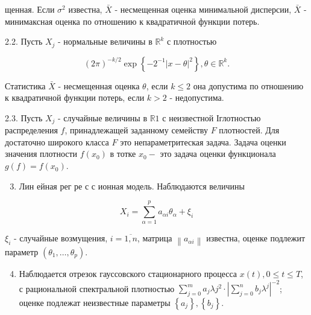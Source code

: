 \documentclass[10pt]{article}
\begin{document}
щенная. Если $\sigma^{2}$ известна, $\bar{X}$ - несмещенная оценка минимальной дисперсии, $\bar{X}$ - минимаксная оценка по отношению к квадратичноӥ функции потерь.



2.2. Пусть $X_{j}$ - нормальные величины в $\mathbb{R}^{k}$ с плотностью



\[

(2 \pi)^{-k / 2} \exp \left\{-2^{-1}|x-\theta|^{2}\right\}, \theta \in \mathbb{R}^{k} .

\]



Статистика $\bar{X}$ - несмещенная оценка $\theta$, если $k \leqslant 2$ она допустима по отношению к квадратичной функции потерь, если $k>2$ - недопустима.



2.3. Пусть $X_{j}$ - случайные величины в $\mathbb{R} 1$ с неизвестной Іглотностью распределения $f$, принадлежащей заданному семейству $F$ плотностей. Для достаточно широкого класса $F$ это непараметритеская задача. Задача оценки значения плотности $f\left(x_{0}\right)$ в тотке $x_{0}-$ это задача оценки функционала $g(f)=f\left(x_{0}\right)$.



\begin{enumerate}

  \setcounter{enumi}{2}

  \item Лин ейная рег ре с с ионная модель. Наблюдаются величины

\end{enumerate}



\[

X_{i}=\sum_{\alpha=1}^{p} a_{\alpha i} \theta_{\alpha}+\xi_{i}

\]



$\xi_{i}$ - случайные возмущения, $i=\overline{1, n}$, матрица $\left\|a_{\alpha i}\right\|$ известна, оценке подлежит параметр $\left(\theta_{1}, \ldots, \theta_{p}\right)$.



\begin{enumerate}

  \setcounter{enumi}{3}

  \item Наблюдается отрезок гауссовского стационарного процесса $x(t), 0 \leqslant t \leqslant T$, с рациональной спектральной плотностью $\sum_{j=0}^{m} a_{j} \lambda j^{2} \cdot\left|\sum_{j=0}^{n} b_{j} \lambda^{j}\right|^{-2}$; оценке подлежат неизвестные параметры $\left\{a_{j}\right\},\left\{b_{j}\right\}$.

\end{enumerate}
\end{document}
